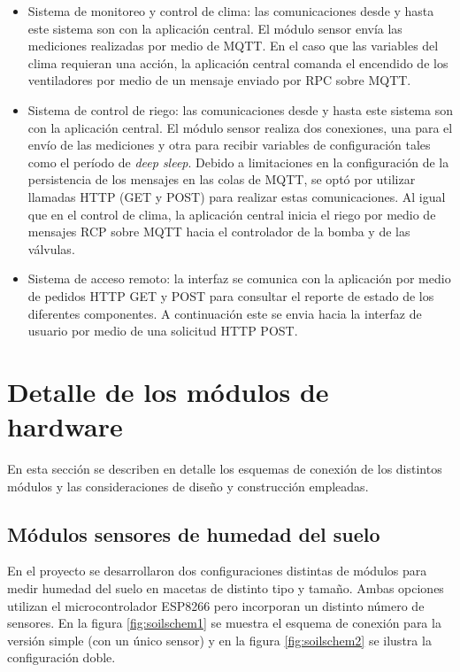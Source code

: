  \begin{itemize}
	\item Sistema de monitoreo y control de clima: las comunicaciones desde y hasta este sistema son con la aplicación central.
	El módulo sensor envía las mediciones realizadas por medio de MQTT.
	En el caso que las variables del clima requieran una acción, la aplicación central comanda el encendido de los ventiladores por medio de un mensaje enviado por RPC \citep{rfc1057} sobre MQTT.
	
	\item Sistema de control de riego: las comunicaciones desde y hasta este sistema son con la aplicación central.
	El módulo sensor realiza dos conexiones, una para el envío de las mediciones y otra para recibir variables de configuración tales como el período de \textit{deep sleep}. Debido a limitaciones en la configuración de la persistencia de los mensajes en las colas de MQTT, se optó por utilizar llamadas HTTP (GET y POST) para realizar estas comunicaciones.
	Al igual que en el control de clima, la aplicación central inicia el riego por medio de mensajes RCP sobre MQTT hacia el controlador de la bomba y de las válvulas.
	
	\item Sistema de acceso remoto: la interfaz se comunica con la aplicación por medio de pedidos HTTP GET y POST para consultar el reporte de estado de los diferentes componentes. A continuación este se envia hacia la interfaz de usuario por medio de una solicitud HTTP POST.
 
 
 
 
 \end{itemize}






\section{Detalle de los módulos de hardware}
\label{sec:Módulos de hardware}
En esta sección se describen en detalle los esquemas de conexión de los distintos módulos y las consideraciones de diseño y construcción empleadas. 

\subsection{Módulos sensores de humedad del suelo}
\label{Módulos sensores de humedad del suelo}


En el proyecto se desarrollaron dos configuraciones distintas de módulos para medir humedad del suelo en macetas de distinto tipo y tamaño. Ambas opciones utilizan el microcontrolador ESP8266 pero incorporan un distinto número de sensores. En la figura \ref{fig:soilschem1} se muestra el esquema de conexión para la versión simple (con un único sensor) y en la figura \ref{fig:soilschem2} se ilustra la configuración doble.


